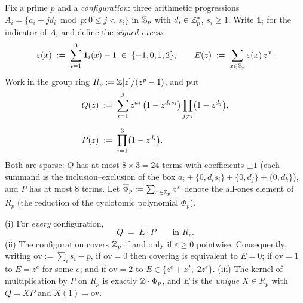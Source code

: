 Fix a prime $p$ and a \emph{configuration}: three arithmetic progressions
$A_i=\{a_i+jd_i \bmod p:0\le j<s_i\}$ in $\mathbb{Z}_p$ with $d_i\in\mathbb{Z}_p^{*}$,
$s_i\ge 1$. Write $\mathbf 1_i$ for the indicator of $A_i$ and define the
\emph{signed excess}
\[
\varepsilon(x)\;:=\;\sum_{i=1}^{3}\mathbf 1_i(x)-1\;\in\;\{-1,0,1,2\},
\qquad
E(z)\;:=\;\sum_{x\in\mathbb{Z}_p}\varepsilon(x)\,z^x .
\]
Work in the group ring $R_p:=\mathbb{Z}[z]/(z^p-1)$, and put
\begin{align*}
Q(z)\;&:=\;\sum_{i=1}^{3} z^{a_i}\,\bigl(1-z^{d_i s_i}\bigr)
        \prod_{j\ne i}\bigl(1-z^{d_j}\bigr),\\[\medskipamount]
P(z)\;&:=\;\prod_{i=1}^{3}\bigl(1-z^{d_i}\bigr).
\end{align*}
Both are sparse: $Q$ has at most $8\times 3=24$ terms with coefficients
$\pm1$ (each summand is the inclusion--exclusion of the box
$a_i+\{0,d_is_i\}+\{0,d_j\}+\{0,d_k\}$), and $P$ has at most $8$ terms. Let
$\overline\Phi_p:=\sum_{x\in\mathbb{Z}_p}z^x$ denote the all-ones element of $R_p$
(the reduction of the cyclotomic polynomial $\Phi_p$).

\begin{theorem}\label{thm:GT}
\;\textup{(i)} For \emph{every} configuration,
\[
Q \;=\; E\cdot P \qquad\text{in } R_p .
\]
\textup{(ii)} The configuration covers $\mathbb{Z}_p$ if and only if
$\varepsilon\ge 0$ pointwise. Consequently, writing
$\mathrm{ov}:=\sum_i s_i-p$, if $\mathrm{ov}=0$ then covering is equivalent
to $E=0$; if $\mathrm{ov}=1$ to $E=z^e$ for some $e$; and if
$\mathrm{ov}=2$ to $E\in\{z^e+z^f,\;2z^e\}$.
\textup{(iii)} The kernel of multiplication by $P$ on $R_p$ is exactly
$\mathbb{Z}\cdot\overline\Phi_p$, and $E$ is the \emph{unique} $X\in R_p$ with
$Q=XP$ and $X(1)=\mathrm{ov}$.
\end{theorem}

